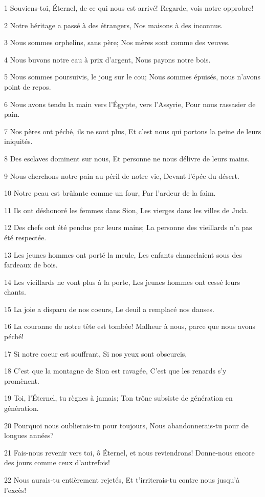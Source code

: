 \par 1 Souviens-toi, Éternel, de ce qui nous est arrivé! Regarde, vois notre opprobre!
\par 2 Notre héritage a passé à des étrangers, Nos maisons à des inconnus.
\par 3 Nous sommes orphelins, sans père; Nos mères sont comme des veuves.
\par 4 Nous buvons notre eau à prix d'argent, Nous payons notre bois.
\par 5 Nous sommes poursuivis, le joug sur le cou; Nous sommes épuisés, nous n'avons point de repos.
\par 6 Nous avons tendu la main vers l'Égypte, vers l'Assyrie, Pour nous rassasier de pain.
\par 7 Nos pères ont péché, ils ne sont plus, Et c'est nous qui portons la peine de leurs iniquités.
\par 8 Des esclaves dominent sur nous, Et personne ne nous délivre de leurs mains.
\par 9 Nous cherchons notre pain au péril de notre vie, Devant l'épée du désert.
\par 10 Notre peau est brûlante comme un four, Par l'ardeur de la faim.
\par 11 Ils ont déshonoré les femmes dans Sion, Les vierges dans les villes de Juda.
\par 12 Des chefs ont été pendus par leurs mains; La personne des vieillards n'a pas été respectée.
\par 13 Les jeunes hommes ont porté la meule, Les enfants chancelaient sous des fardeaux de bois.
\par 14 Les vieillards ne vont plus à la porte, Les jeunes hommes ont cessé leurs chants.
\par 15 La joie a disparu de nos coeurs, Le deuil a remplacé nos danses.
\par 16 La couronne de notre tête est tombée! Malheur à nous, parce que nous avons péché!
\par 17 Si notre coeur est souffrant, Si nos yeux sont obscurcis,
\par 18 C'est que la montagne de Sion est ravagée, C'est que les renards s'y promènent.
\par 19 Toi, l'Éternel, tu règnes à jamais; Ton trône subsiste de génération en génération.
\par 20 Pourquoi nous oublierais-tu pour toujours, Nous abandonnerais-tu pour de longues années?
\par 21 Fais-nous revenir vers toi, ô Éternel, et nous reviendrons! Donne-nous encore des jours comme ceux d'autrefois!
\par 22 Nous aurais-tu entièrement rejetés, Et t'irriterais-tu contre nous jusqu'à l'excès!


